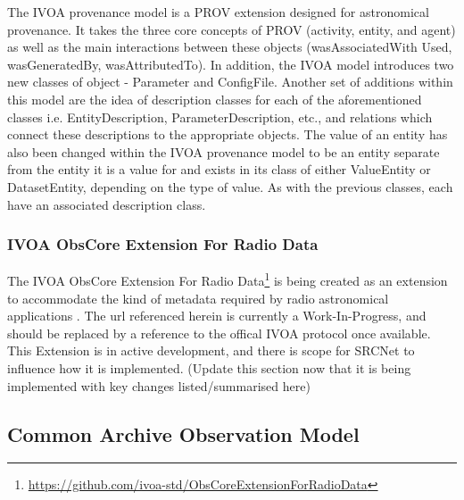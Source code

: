 The IVOA provenance model is a PROV extension designed for astronomical provenance.
It takes the three core concepts of PROV (activity, entity, and agent) as well as the main interactions between these objects (wasAssociatedWith Used, wasGeneratedBy, wasAttributedTo).
In addition, the IVOA model introduces two new classes of object - Parameter and ConfigFile. 
Another set of additions within this model are the idea of description classes for each of the aforementioned classes i.e. EntityDescription, ParameterDescription, etc., and relations which connect these descriptions to the appropriate objects.
The value of an entity has also been changed within the IVOA provenance model to be an entity separate from the entity it is a value for and exists in its class of either ValueEntity or DatasetEntity, depending on the type of value.
As with the previous classes, each have an associated description class. 


\subsubsection{IVOA ObsCore Extension For Radio Data}
    
The IVOA ObsCore Extension For Radio Data\footnote{\url{https://github.com/ivoa-std/ObsCoreExtensionForRadioData}} is being created as an extension to accommodate the kind of metadata required by radio astronomical applications .  The url referenced herein is currently a Work-In-Progress, and should be replaced by a reference to the offical IVOA protocol once available.  This Extension is in active development, and there is scope for SRCNet to influence how it is implemented.  (Update this section now that it is being implemented with key changes listed/summarised here)

\subsection{Common Archive Observation Model}

